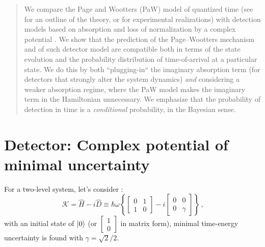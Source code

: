 \documentclass[landscape]{a0poster}
\DeclareMathOperator*{\repr}{\equiv}      %
\begin{document}
\begin{multicols}{3}
%
%
\color{Navy} %
%
\begin{abstract}%
\noindent %
We compare the Page and Wootters (PaW) model of quantized time
(see \parencite{PageWootters, Lloyd:Time} for an outline of the theory,
or \parencite{Moreva:illustration, Moreva_position} for experimental realizations)
with detection models based on absorption and loss of normalization
by a complex potential \parencite{RuschhauptAbsorption}. We show that the prediction
of the Page--Wootters mechanism and of such detector model are compatible both in terms
of the state evolution and
the probability distribution of
time-of-arrival at a particular state.
We do this by both ``plugging-in``
the imaginary absorption term (for detectors that strongly alter the system dynamics)
\emph{and} considering a weaker absorption regime, where the PaW model makes
the imaginary term in the Hamiltonian unnecessary. We emphasize that the probability
of detection in time is a \emph{conditional}
probability, in the Bayesian \parencite{Maccone:QMOT} sense.
\end{abstract}

\setlength{\parindent}{1.5em} %


\color{DarkSlateGray} %

\normalsize

\section*{Detector: Complex potential of minimal uncertainty}

For a two-level system,  let's consider \parencite{RuschhauptAbsorption}:
\begin{equation}\label{eq:complexpot}
  \mathcal{K} = \hat{H} - i\hat{D} \repr
    \hbar\omega\left\{
      \left[\begin{matrix}0 & 1\\1 & 0\end{matrix}\right] -
      i \left[\begin{matrix}0 & 0\\0 & \gamma \end{matrix}\right]
    \right\}
    \,\text{,}
\end{equation}
with an initial state of $\ket{0}$
(or $\left[\begin{matrix}1\\0\end{matrix}\right]$ in matrix form),
minimal time-energy uncertainty is found with
$\gamma = \sqrt{2}/2$.


\end{multicols}
\end{document}
